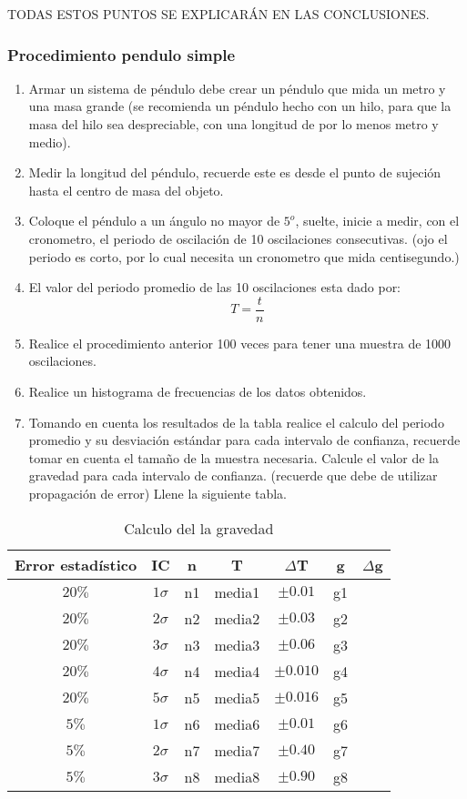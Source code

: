 \documentclass[
]{article}
\providecommand{\tightlist}{%
  \setlength{\itemsep}{0pt}\setlength{\parskip}{0pt}}
\begin{document}
TODAS ESTOS PUNTOS SE EXPLICARÁN EN LAS CONCLUSIONES.

\subsubsection{\texorpdfstring{\textbf{Procedimiento pendulo simple
}}{Procedimiento pendulo simple }}\label{procedimiento-pendulo-simple}

\begin{enumerate}
\def\labelenumi{\arabic{enumi}.}
\tightlist
\item
  Armar un sistema de péndulo debe crear un péndulo que mida un metro y
  una masa grande (se recomienda un péndulo hecho con un hilo, para que
  la masa del hilo sea despreciable, con una longitud de por lo menos
  metro y medio).
\item
  Medir la longitud del péndulo, recuerde este es desde el punto de
  sujeción hasta el centro de masa del objeto.
\item
  Coloque el péndulo a un ángulo no mayor de \(5^o\), suelte, inicie a
  medir, con el cronometro, el periodo de oscilación de 10 oscilaciones
  consecutivas. (ojo el periodo es corto, por lo cual necesita un
  cronometro que mida centisegundo.)
\item
  El valor del periodo promedio de las 10 oscilaciones esta dado por:
  \[T=\frac{t}{n}\]
\item
  Realice el procedimiento anterior 100 veces para tener una muestra de
  1000 oscilaciones.
\item
  Realice un histograma de frecuencias de los datos obtenidos.
\item
  Tomando en cuenta los resultados de la tabla realice el calculo del
  periodo promedio y su desviación estándar para cada intervalo de
  confianza, recuerde tomar en cuenta el tamaño de la muestra necesaria.
  Calcule el valor de la gravedad para cada intervalo de confianza.
  (recuerde que debe de utilizar propagación de error) Llene la
  siguiente tabla.
\end{enumerate}

\begin{table}[ht]
\centering
\caption{Calculo del la gravedad}
\begin{tabular}{ccccccc}
Error estadístico & IC & n & T & $\Delta$T & g & $\Delta$g \\  \hline
$20\%$ & $1 \sigma$ & n1 & media1 & $\pm 0.01$ & g1 &\\
$20\%$ & $2 \sigma$ & n2 & media2 & $\pm 0.03$ & g2 &\\
$20\%$ & $3 \sigma$ & n3 & media3 & $\pm 0.06$ & g3 &\\
$20\%$ & $4 \sigma$ & n4 & media4 & $\pm 0.010$ & g4 &\\
$20\%$ & $5 \sigma$ & n5 & media5 & $\pm 0.016$ & g5 &\\
$5\%$ & $1 \sigma$ & n6 & media6 & $\pm 0.01$& g6 &\\
$5\%$ & $2 \sigma$ & n7 & media7 & $\pm 0.40$& g7 &\\
$5\%$ & $3 \sigma$ & n8 & media8 & $\pm 0.90$& g8 &\\
\hline
\end{tabular}
\end{table}
\end{document}
